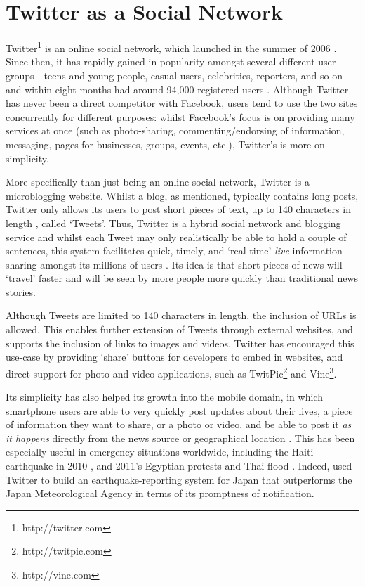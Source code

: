 \section{Twitter as a Social Network}
Twitter\footnote{http://twitter.com} is an online social network, which launched in the summer of 2006 \cite{krishnamurthy08}. Since then, it has rapidly gained in popularity amongst several different user groups - teens and young people, casual users, celebrities, reporters, and so on - and within eight months had around 94,000 registered users \cite{java07}. Although Twitter has never been a direct competitor with Facebook, users tend to use the two sites concurrently for different purposes: whilst Facebook's focus is on providing many services at once (such as photo-sharing, commenting/endorsing of information, messaging, pages for businesses, groups, events, etc.), Twitter's is more on simplicity.

More specifically than just being an online social network, Twitter is a microblogging website. Whilst a blog, as mentioned, typically contains long posts, Twitter only allows its users to post short pieces of text, up to 140 characters in length \cite{krishnamurthy08, huberman08}, called `Tweets'. Thus, Twitter is a hybrid social network and blogging service and whilst each Tweet may only realistically be able to hold a couple of sentences, this system facilitates quick, timely, and `real-time' \textit{live} information-sharing amongst its millions of users \cite{zhao09}. Its idea is that short pieces of news will `travel' faster and will be seen by more people more quickly than traditional news stories.

Although Tweets are limited to 140 characters in length, the inclusion of URLs is allowed. This enables further extension of Tweets through external websites, and supports the inclusion of links to images and videos. Twitter has encouraged this use-case by providing `share' buttons for developers to embed in websites, and direct support for photo and video applications, such as TwitPic\footnote{http://twitpic.com} and Vine\footnote{http://vine.com}.

Its simplicity has also helped its growth into the mobile domain, in which smartphone users are able to very quickly post updates about their lives, a piece of information they want to share, or a photo or video, and be able to post it \textit{as it happens} directly from the news source or geographical location \cite{castillo11}. This has been especially useful in emergency situations worldwide, including the Haiti earthquake in 2010 \cite{muralidharan11}, and 2011's Egyptian protests \cite{wilson11} and Thai flood \cite{kongthon12}. Indeed, \citet{sakaki10} used Twitter to build an earthquake-reporting system for Japan that outperforms the Japan Meteorological Agency in terms of its promptness of notification.

